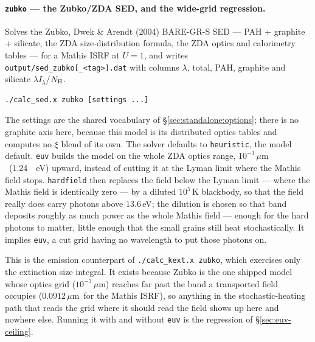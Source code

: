 \documentclass{my_memo}
\newcommand{\code}[1]{\texttt{#1}}
\newcommand{\lamIlam}{\ensuremath{\lambda I_\lambda}}
\newcommand{\Nh}{\ensuremath{N_{\rm H}}}
\newcommand{\um}{\ensuremath{\,\mu\mathrm{m}}}
\begin{document}
\paragraph{\code{zubko} --- the Zubko/ZDA SED, and the wide-grid
regression.}\label{sec:standalone:zubko} Solves the Zubko, Dwek \& Arendt (2004) BARE-GR-S SED --- PAH + graphite +
silicate, the ZDA size-distribution formula, the ZDA optics and calorimetry
tables --- for a Mathis ISRF at $U = 1$, and writes
\code{output/sed\_zubko[\_<tag>].dat} with columns $\lambda$,
total, PAH, graphite and silicate \lamIlam/\Nh.
\begin{lstlisting}[style=sh]
./calc_sed.x zubko [settings ...]
\end{lstlisting}
\noindent The settings are the shared vocabulary of
\S\ref{sec:standalone:options}; there is no graphite axis here, because this
model is its distributed optics tables and computes no $\xi$ blend of its own.
The solver defaults to \code{heuristic}, the model default. \code{euv} builds
the model on the whole ZDA optics range, $10^{-3}$\um\ (\SI{1.24}{\kilo
\electronvolt}) upward, instead of cutting it at the Lyman limit where the
Mathis field stops. \code{hardfield} then replaces the field below the Lyman
limit --- where the Mathis field is identically zero --- by a diluted
$10^5\,$K blackbody, so that the field really does carry photons above
$13.6\,$eV; the dilution is chosen so that band deposits roughly as much power
as the whole Mathis field --- enough for the hard photons to matter, little
enough that the small grains still heat stochastically. It implies \code{euv},
a cut grid having no wavelength to put those photons on.

\medskip
\noindent This is the emission counterpart of \code{./calc\_kext.x zubko}, which exercises
only the extinction size integral. It exists because Zubko is the one shipped
model whose optics grid ($10^{-3}$\um) reaches far past the band a transported
field occupies ($0.0912$\um\ for the Mathis ISRF), so anything in the
stochastic-heating path that reads the grid where it should read the field shows
up here and nowhere else. Running it with and without \code{euv} is the
regression of \S\ref{sec:euv-ceiling}.
\end{document}
